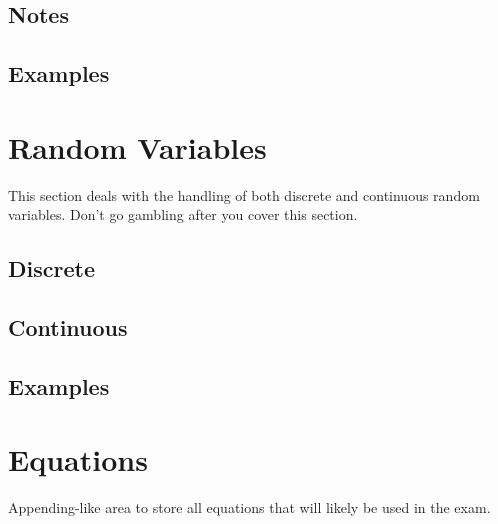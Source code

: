 \subsection{Notes}
\subsection{Examples}

\section{Random Variables}
This section deals with the handling of both discrete and continuous random variables. Don't go gambling after you cover this section.
\subsection{Discrete}
\subsection{Continuous}
\subsection{Examples}

\section{Equations}
Appending-like area to store all equations that will likely be used in the exam.
